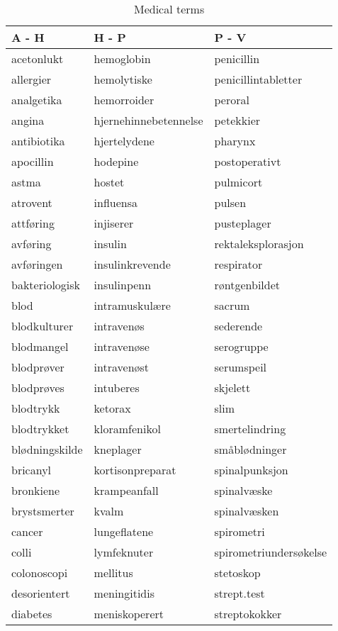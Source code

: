 \begin{table}[htbp] \footnotesize \center
\caption{Medical terms\label{tab:medicalterms}}
\begin{tabular}{l l l}
    \toprule
    A - H & H - P & P - V \\
    \midrule
    acetonlukt & hemoglobin & penicillin \\
    allergier & hemolytiske & penicillintabletter \\
    analgetika & hemorroider & peroral \\
    angina & hjernehinnebetennelse & petekkier \\
    antibiotika & hjertelydene & pharynx \\
    apocillin & hodepine & postoperativt \\
    astma & hostet & pulmicort \\
    atrovent & influensa & pulsen \\
    attføring & injiserer & pusteplager \\
    avføring & insulin & rektaleksplorasjon \\
    avføringen & insulinkrevende & respirator \\
    bakteriologisk & insulinpenn & røntgenbildet \\
    blod & intramuskulære & sacrum \\
    blodkulturer & intravenøs & sederende \\
    blodmangel & intravenøse & serogruppe \\
    blodprøver & intravenøst & serumspeil \\
    blodprøves & intuberes & skjelett \\
    blodtrykk & ketorax & slim \\
    blodtrykket & kloramfenikol & smertelindring \\
    blødningskilde & kneplager & småblødninger \\
    bricanyl & kortisonpreparat & spinalpunksjon \\
    bronkiene & krampeanfall & spinalvæske \\
    brystsmerter & kvalm & spinalvæsken \\
    cancer & lungeflatene & spirometri \\
    colli & lymfeknuter & spirometriundersøkelse \\
    colonoscopi & mellitus & stetoskop \\
    desorientert & meningitidis & strept.test \\
    diabetes & meniskoperert & streptokokker \\

\end{tabular}
\end{table}
